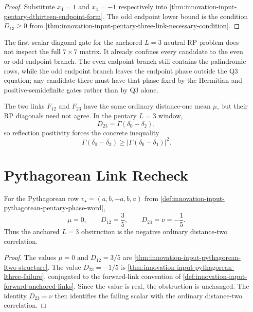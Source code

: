 \begin{proof}
Substitute $x_4=1$ and $x_4=-1$ respectively into
\autoref{thm:innovation-input-pentary-dthirteen-endpoint-form}. The odd
endpoint lower bound is the condition $D_{13}\ge0$ from
\autoref{thm:innovation-input-pentary-three-link-necessary-condition}.
\end{proof}

\begin{principle}
\label{prin:innovation-input-endpoint-first-pentary-search}
The first scalar diagonal gate for the anchored $L=3$ neutral RP problem
does not inspect the full $7\times7$ matrix. It already confines every
candidate to the even or odd endpoint branch. The even endpoint branch
still contains the palindromic rows, while the odd endpoint branch leaves
the endpoint phase outside the Q3 equation; any candidate there must have
that phase fixed by the Hermitian and positive-semidefinite gates rather
than by Q3 alone.
\end{principle}

\begin{corollary}
\label{cor:innovation-input-pentary-anchor-effect-algebraic-form}
The two links $F_{12}$ and $F_{23}$ have the same ordinary distance-one
mean $\mu$, but their RP diagonals need not agree. In the pentary
$L=3$ window,
$$
D_{23}=\Gamma(\delta_0-\delta_2),
$$
so reflection positivity forces the concrete inequality
$$
\Gamma(\delta_0-\delta_2)
\ge
\left|\Gamma(\delta_0-\delta_1)\right|^2.
$$
\end{corollary}

\section{Pythagorean Link Recheck}
\label{sec:innovation-input-pentary-pythagorean-link-recheck}

\begin{corollary}
\label{cor:innovation-input-pythagorean-second-link-violation}
For the Pythagorean row $v_\star=(a,b,-a,b,a)$ from
\autoref{def:innovation-input-pythagorean-pentary-phase-word},
$$
\mu=0,
\qquad
D_{12}=\frac35,
\qquad
D_{23}=\nu=-\frac15.
$$
Thus the anchored $L=3$ obstruction is the negative ordinary
distance-two correlation.
\end{corollary}

\begin{proof}
The values $\mu=0$ and $D_{12}=3/5$ are
\autoref{thm:innovation-input-pythagorean-ltwo-structure}. The value
$D_{23}=-1/5$ is
\autoref{thm:innovation-input-pythagorean-lthree-failure}, conjugated to
the forward-link convention of
\autoref{def:innovation-input-forward-anchored-links}. Since the value is
real, the obstruction is unchanged. The identity $D_{23}=\nu$ then
identifies the failing scalar with the ordinary distance-two correlation.
\end{proof}
